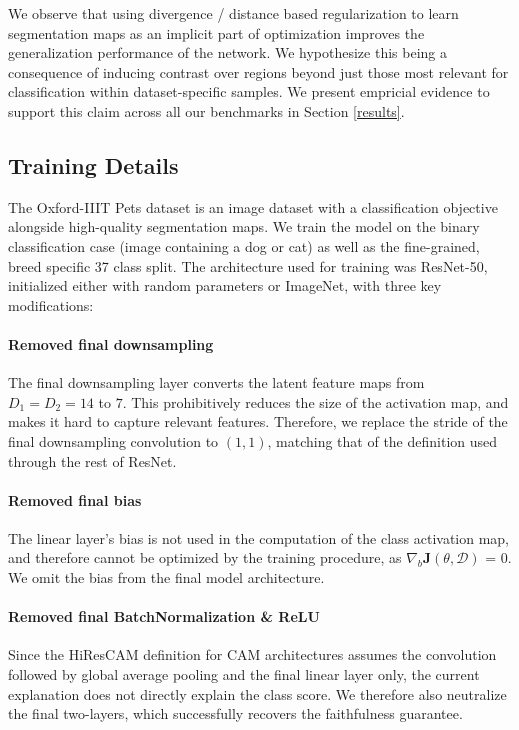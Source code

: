 \documentclass{article}
\theoremstyle{plain}
\theoremstyle{definition}
\theoremstyle{remark}
\begin{document}
We observe that using divergence / distance based regularization to learn segmentation maps as an implicit part of optimization improves the generalization performance of the network. We hypothesize this being a consequence of inducing contrast over regions beyond just those most relevant for classification within dataset-specific samples. We present empricial evidence to support this claim across all our benchmarks in Section \ref{results}.

\subsection{Training Details}


The Oxford-IIIT Pets dataset is an image dataset with a classification objective alongside high-quality segmentation maps. We train the model on the binary classification case (image containing a dog or cat) as well as the fine-grained, breed specific 37 class split. The architecture used for training was ResNet-50, initialized either with random parameters or ImageNet, with three key modifications:

\paragraph{Removed final downsampling} The final downsampling layer converts the latent feature maps from $D_1 = D_2 = 14$ to $7$. This prohibitively reduces the size of the activation map, and makes it hard to capture relevant features. Therefore, we replace the stride of the final downsampling convolution to $(1,1)$, matching that of the definition used through the rest of ResNet. 

\paragraph{Removed final bias} The linear layer's bias is not used in the computation of the class activation map, and therefore cannot be optimized by the training procedure, as $\nabla_b \mathcal{\bm{J}}(\theta, \mathcal{D})$ = 0. We omit the bias from the final model architecture.

\paragraph{Removed final BatchNormalization \& ReLU} Since the HiResCAM definition for CAM architectures assumes the convolution followed by global average pooling and the final linear layer only, the current explanation does not directly explain the class score. We therefore also neutralize the final two-layers, which successfully recovers the faithfulness guarantee.
\end{document}
